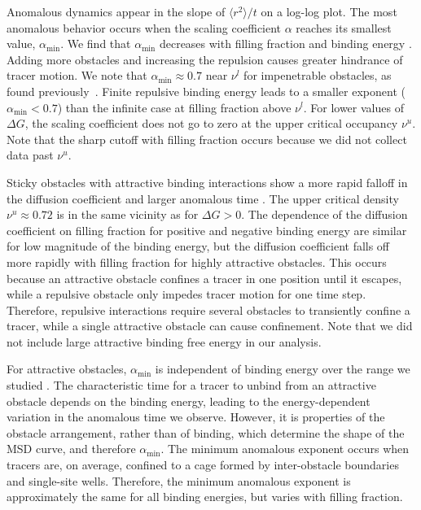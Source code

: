 Anomalous dynamics appear in the slope of $ \langle r^2 \rangle / t $ on a
log-log plot. The most anomalous behavior occurs when the scaling coefficient $
\alpha $ reaches its smallest value, $\alpha_{\min}$.  We find that
$\alpha_{\min}$ decreases with filling fraction and binding energy
. Adding more obstacles and increasing the repulsion
causes greater hindrance of tracer motion.  We note that $\alpha_{\min} \approx
0.7$ near $\nu^l$ for impenetrable obstacles, as found
previously~\cite{saxton_anomalous_94, nicolau_sources_07}.  Finite repulsive
binding energy leads to a smaller exponent ($ \alpha_{\min} < 0.7 $) than the
infinite case at filling fraction above $\nu^l$. For lower values of $\Delta G$,
the scaling coefficient does not go to zero at the upper critical occupancy $
\nu^u $.  Note that the sharp cutoff with filling fraction occurs because we did
not collect data past $ \nu^u $.

Sticky obstacles with attractive binding interactions show a more rapid falloff
in the diffusion coefficient and larger anomalous time .
The upper critical density $ \nu^u \approx 0.72 $ is in the same vicinity as for
$\Delta G > 0$.  The dependence of the diffusion coefficient on filling fraction
for positive and negative binding energy are similar for low magnitude of the
binding energy, but the diffusion coefficient falls off more rapidly with
filling fraction for highly attractive obstacles. This occurs because an
attractive obstacle confines a tracer in one position until it escapes, while a
repulsive obstacle only impedes tracer motion for one time step. Therefore,
repulsive interactions require several obstacles to transiently confine a
tracer, while a single attractive obstacle can cause confinement. Note that we
did not include large attractive binding free energy in our analysis.

For attractive obstacles, $ \alpha_{\min} $ is independent of binding energy
over the range we studied . The characteristic time for a
tracer to unbind from an attractive obstacle depends on the binding energy,
leading to the energy-dependent variation in the anomalous time we observe.
However, it is properties of the obstacle arrangement, rather than of binding,
which determine the shape of the MSD curve, and therefore $\alpha_{\min}$.  The
minimum anomalous exponent occurs when tracers are, on average, confined to a
cage formed by inter-obstacle boundaries and single-site wells.  Therefore, the
minimum anomalous exponent is approximately the same for all binding energies, but
varies with filling fraction.

